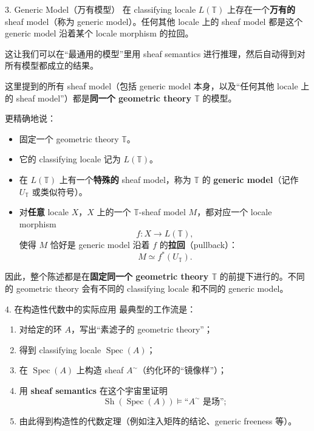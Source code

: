 \documentclass{beamer}
\begin{document}
\begin{frame}{3. Generic Model（万有模型）}
在 classifying locale $L(\mathbb{T})$ 上存在一个\textbf{万有的} sheaf model（称为 generic model）。任何其他 locale 上的 sheaf model 都是这个 generic model 沿着某个 locale morphism 的拉回。

这让我们可以在``最通用的模型''里用 sheaf semantics 进行推理，然后自动得到对所有模型都成立的结果。
\end{frame}

\begin{frame}
这里提到的所有 sheaf model（包括 generic model 本身，以及``任何其他 locale 上的 sheaf model''）都是\textbf{同一个 geometric theory \(\mathbb{T}\)} 的模型。

更精确地说：

\begin{itemize}
\item 固定一个 geometric theory \(\mathbb{T}\)。
\item 它的 classifying locale 记为 \(L(\mathbb{T})\)。
\item 在 \(L(\mathbb{T})\) 上有一个\textbf{特殊的} sheaf model，称为 \(\mathbb{T}\) 的 \textbf{generic model}（记作 \(U_{\mathbb{T}}\) 或类似符号）。
\item 对\textbf{任意} locale \(X\)，\(X\) 上的一个 \(\mathbb{T}\)-sheaf model \(M\)，都对应一个 locale morphism
  \[
  f : X \to L(\mathbb{T}),
  \]
  使得 \(M\) 恰好是 generic model 沿着 \(f\) 的\textbf{拉回}（pullback）：
  \[
  M \simeq f^*(U_{\mathbb{T}}).
  \]
\end{itemize}

因此，整个陈述都是在\textbf{固定同一个 geometric theory \(\mathbb{T}\)} 的前提下进行的。不同的 geometric theory 会有不同的 classifying locale 和不同的 generic model。
\end{frame}

\begin{frame}{4. 在构造性代数中的实际应用}
最典型的工作流是：

\begin{enumerate}
    \item 对给定的环 $A$，写出``素滤子的 geometric theory''；
    \item 得到 classifying locale $\operatorname{Spec}(A)$；
    \item 在 $\operatorname{Spec}(A)$ 上构造 sheaf $A^\sim$（约化环的``镜像样''）；
    \item 用 \textbf{sheaf semantics} 在这个宇宙里证明
    \[
    \operatorname{Sh}(\operatorname{Spec}(A))\models\text{``$A^\sim$ 是场''};
    \]
    \item 由此得到构造性的代数定理（例如注入矩阵的结论、generic freeness 等）。
\end{enumerate}
\end{frame}
\end{document}
